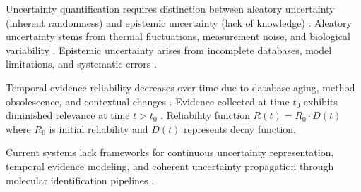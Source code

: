 Uncertainty quantification requires distinction between aleatory uncertainty (inherent randomness) and epistemic uncertainty (lack of knowledge) \cite{kiureghian2009aleatory}. Aleatory uncertainty stems from thermal fluctuations, measurement noise, and biological variability \cite{vanderwerf2005uncertainty}. Epistemic uncertainty arises from incomplete databases, model limitations, and systematic errors \cite{helton2004alternative}.

Temporal evidence reliability decreases over time due to database aging, method obsolescence, and contextual changes \cite{guha2005chemical}. Evidence collected at time $t_0$ exhibits diminished relevance at time $t > t_0$ \cite{steinbeck2003chemical}. Reliability function $R(t) = R_0 \cdot D(t)$ where $R_0$ is initial reliability and $D(t)$ represents decay function.

Current systems lack frameworks for continuous uncertainty representation, temporal evidence modeling, and coherent uncertainty propagation through molecular identification pipelines \cite{boulder2019uncertainty, rogers2019molecular}.
